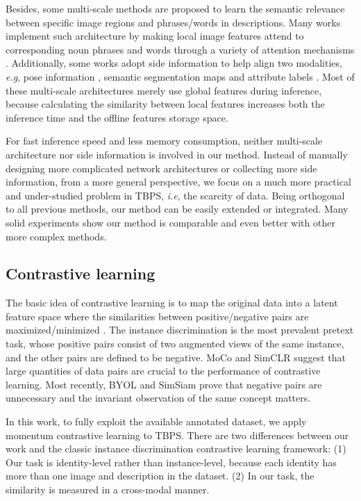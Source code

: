 \documentclass{bmvc2k}
\def\ie{\emph{i.e}\bmvaOneDot}
\def\eg{\emph{e.g}\bmvaOneDot}
\newcommand{\revision}[1]{#1}
\begin{document}
Besides, some multi-scale methods are proposed to learn the semantic relevance between specific image regions and phrases/words in descriptions. 
Many works implement such architecture by making local image features attend to corresponding noun phrases and words through a variety of attention mechanisms \cite{niu2020mia,zheng2020hierarchical,gao2021contextual,farooq2021axm,wang2021mgel}.
Additionally, some works adopt side information to help align two modalities, \eg, pose information \cite{jing2020pose}, semantic segmentation maps \cite{wang2020vitaa} and attribute labels \cite{aggarwal2020cmaam}. 
Most of these multi-scale architectures merely use global features during inference, because calculating the similarity between local features increases both the inference time and the offline features storage space.

For fast inference speed and less memory consumption, neither multi-scale architecture nor side information is involved in our method.
Instead of manually designing more complicated network architectures or collecting more side information, from a more general perspective, we focus on a much more practical and under-studied problem in TBPS, \ie, the scarcity of data. \revision{Being orthogonal to all previous methods, our method can be easily extended or integrated. Many solid experiments show our method is comparable and even better with other more complex methods.}

\vspace*{-3mm}
\subsection{Contrastive learning}
The basic idea of contrastive learning is to map the original data into a latent feature space where the similarities between positive/negative pairs are maximized/minimized \cite{hadsell2006contrastive}. 
The instance discrimination is the most prevalent pretext task, whose positive pairs consist of two augmented views of the same instance, and the other pairs are defined to be negative. 
MoCo \cite{he2020moco} and SimCLR \cite{chen2020simclr} suggest that large quantities of data pairs are crucial to the performance of contrastive learning. 
Most recently, BYOL \cite{grill2020byol} and SimSiam \cite{chen2020simsiam} prove that negative pairs are unnecessary and the invariant observation of the same concept matters.

In this work, to fully exploit the available annotated dataset, we apply momentum contrastive learning to TBPS. 
There are two differences between our work and the classic instance discrimination contrastive learning framework: 
(1) Our task is identity-level rather than instance-level, because each identity has more than one image and description in the dataset. 
(2) In our task, the similarity is measured in a cross-modal manner.
\end{document}
